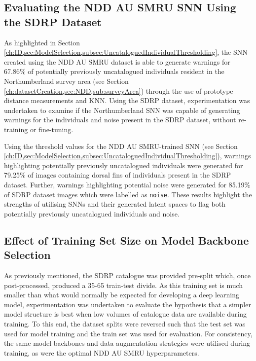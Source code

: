 \subsection{Evaluating the NDD AU SMRU SNN Using the SDRP Dataset}\label{ch:SNNEvaluation,sec:SDRP,sub:NDDuncatalogued}

As highlighted in Section \ref{ch:ID,sec:ModelSelection,subsec:UncataloguedIndividualThresholding}, the SNN created using the NDD AU SMRU dataset is able to generate warnings for 67.86\% of potentially previously uncatalogued individuals resident in the Northumberland survey area (see Section \ref{ch:datasetCreation,sec:NDD,sub:surveyArea}) through the use of prototype distance measurements and KNN. Using the SDRP dataset, experimentation was undertaken to examine if the Northumberland SNN was capable of generating warnings for the individuals and noise present in the SDRP dataset, without re-training or fine-tuning. 

Using the threshold values for the NDD AU SMRU-trained SNN (see Section \ref{ch:ID,sec:ModelSelection,subsec:UncataloguedIndividualThresholding}), warnings highlighting potentially previously uncatalogued individuals were generated for 79.25\% of images containing dorsal fins of individuals present in the SDRP dataset. Further, warnings highlighting potential noise were generated for 85.19\% of SDRP dataset images which were labelled as \texttt{noise}. These results highlight the strengths of utilising SNNs and their generated latent spaces to flag both potentially previously uncatalogued individuals and noise.

\subsection{Effect of Training Set Size on Model Backbone Selection}\label{ch:SNNEvaluation,sec:SDRP,sub:SDRPDataset,sub:reversedSDRP}

 As previously mentioned, the SDRP catalogue was provided pre-split which, once post-processed, produced a 35-65 train-test divide. As this training set is much smaller than what would normally be expected for developing a deep learning model, experimentation was undertaken to evaluate the hypothesis that a simpler model structure is best when low volumes of catalogue data are available during training. To this end, the dataset splits were reversed such that the test set was used for model training and the train set was used for evaluation. For consistency, the same model backbones and data augmentation strategies were utilised during training, as were the optimal NDD AU SMRU hyperparameters. 
 
